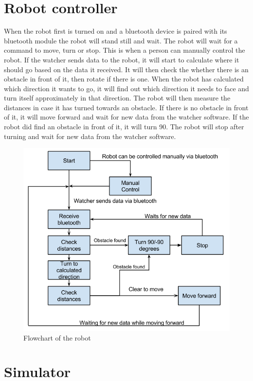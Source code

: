 \section{Robot controller}
When the robot first is turned on and a bluetooth device is paired with its bluetooth module the robot will stand still and wait. The robot will wait for a command to move, turn or stop. This is when a person can manually control the robot. If the watcher sends data to the robot, it will start to calculate where it should go based on the data it received. 
It will then check the whether there is an obstacle in front of it, then rotate if there is one. 
When the robot has calculated which direction it wants to go, it will find out which direction it needs to face and turn itself approximately in that direction. The robot will then measure the distances in case it has turned towards an obstacle. If there is no obstacle in front of it, it will move forward and wait for new data from the watcher software. If the robot did find an obstacle in front of it, it will turn 90\textdegree. The robot will stop after turning and wait for new data from the watcher software. 
\begin{figure}[h]
\label{fig:robotschema}
\begin{center}
\includegraphics[width=0.8\linewidth]{figs/robotschema}
\end{center}
\caption[Robot flowchart]{Flowchart of the robot}
\end{figure}

\section{Simulator}

